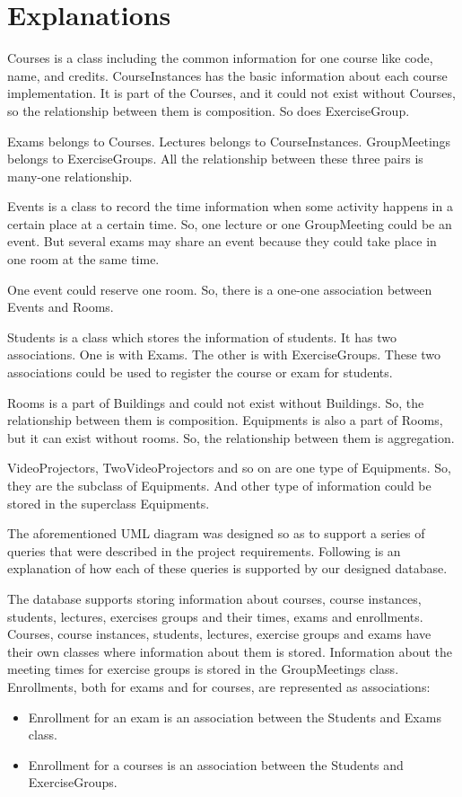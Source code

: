 \documentclass{article}
\begin{document}
\section{Explanations}

Courses is a class including the common information for one course like code, name, and
credits. CourseInstances has the basic information about each course implementation. It is
part of the Courses, and it could not exist without Courses, so the relationship between them
is composition. So does ExerciseGroup.

Exams belongs to Courses. Lectures belongs to CourseInstances. GroupMeetings belongs to
ExerciseGroups. All the relationship between these three pairs is many-one relationship.

Events is a class to record the time information when some activity happens in a certain place
at a certain time. So, one lecture or one GroupMeeting could be an event. But several exams
may share an event because they could take place in one room at the same time.

One event could reserve one room. So, there is a one-one association between Events and
Rooms.

Students is a class which stores the information of students. It has two associations. One is
with Exams. The other is with ExerciseGroups. These two associations could be used to
register the course or exam for students.

Rooms is a part of Buildings and could not exist without Buildings. So, the relationship
between them is composition. Equipments is also a part of Rooms, but it can exist without
rooms. So, the relationship between them is aggregation.

VideoProjectors, TwoVideoProjectors and so on are one type of Equipments. So, they are the
subclass of Equipments. And other type of information could be stored in the superclass
Equipments.

The aforementioned UML diagram was designed so as to support a series of queries that were
described in the project requirements. Following is an explanation of how each of these
queries is supported by our designed database.

The database supports storing information about courses, course instances, students,
lectures, exercises groups and their times, exams and enrollments. Courses, course instances,
students, lectures, exercise groups and exams have their own classes where information
about them is stored. Information about the meeting times for exercise groups is stored in
the GroupMeetings class. Enrollments, both for exams and for courses, are represented as
associations:
\begin{itemize}
	\item Enrollment for an exam is an association between the Students and Exams class.
	\item Enrollment for a courses is an association between the Students and ExerciseGroups.
\end{itemize}
\end{document}
